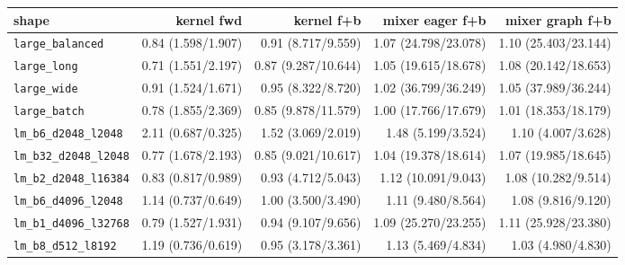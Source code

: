 \begin{tabular}{l r r r r }
\toprule
shape & kernel fwd & kernel f+b & mixer eager f+b & mixer graph f+b \\
\midrule
\texttt{large\_balanced} & 0.84 (1.598/1.907) & 0.91 (8.717/9.559) & 1.07 (24.798/23.078) & 1.10 (25.403/23.144) \\
\texttt{large\_long} & 0.71 (1.551/2.197) & 0.87 (9.287/10.644) & 1.05 (19.615/18.678) & 1.08 (20.142/18.653) \\
\texttt{large\_wide} & 0.91 (1.524/1.671) & 0.95 (8.322/8.720) & 1.02 (36.799/36.249) & 1.05 (37.989/36.244) \\
\texttt{large\_batch} & 0.78 (1.855/2.369) & 0.85 (9.878/11.579) & 1.00 (17.766/17.679) & 1.01 (18.353/18.179) \\
\texttt{lm\_b6\_d2048\_l2048} & 2.11 (0.687/0.325) & 1.52 (3.069/2.019) & 1.48 (5.199/3.524) & 1.10 (4.007/3.628) \\
\texttt{lm\_b32\_d2048\_l2048} & 0.77 (1.678/2.193) & 0.85 (9.021/10.617) & 1.04 (19.378/18.614) & 1.07 (19.985/18.645) \\
\texttt{lm\_b2\_d2048\_l16384} & 0.83 (0.817/0.989) & 0.93 (4.712/5.043) & 1.12 (10.091/9.043) & 1.08 (10.282/9.514) \\
\texttt{lm\_b6\_d4096\_l2048} & 1.14 (0.737/0.649) & 1.00 (3.500/3.490) & 1.11 (9.480/8.564) & 1.08 (9.816/9.120) \\
\texttt{lm\_b1\_d4096\_l32768} & 0.79 (1.527/1.931) & 0.94 (9.107/9.656) & 1.09 (25.270/23.255) & 1.11 (25.928/23.380) \\
\texttt{lm\_b8\_d512\_l8192} & 1.19 (0.736/0.619) & 0.95 (3.178/3.361) & 1.13 (5.469/4.834) & 1.03 (4.980/4.830) \\
\bottomrule
\end{tabular}
